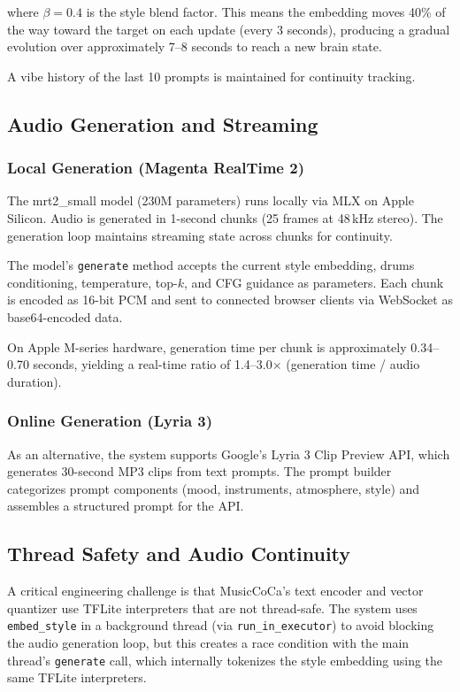 \documentclass[manuscript,review,anonymous]{acmart}
\begin{document}
where $\beta = 0.4$ is the style blend factor. This means the embedding moves 40\% of the way toward the target on each update (every 3 seconds), producing a gradual evolution over approximately 7--8 seconds to reach a new brain state.

A vibe history of the last 10 prompts is maintained for continuity tracking.

\subsection{Audio Generation and Streaming}

\subsubsection{Local Generation (Magenta RealTime 2)}

The mrt2\_small model (230M parameters) runs locally via MLX on Apple Silicon. Audio is generated in 1-second chunks (25 frames at 48\,kHz stereo). The generation loop maintains streaming state across chunks for continuity.

The model's \texttt{generate} method accepts the current style embedding, drums conditioning, temperature, top-$k$, and CFG guidance as parameters. Each chunk is encoded as 16-bit PCM and sent to connected browser clients via WebSocket as base64-encoded data.

On Apple M-series hardware, generation time per chunk is approximately 0.34--0.70 seconds, yielding a real-time ratio of 1.4--3.0$\times$ (generation time / audio duration).

\subsubsection{Online Generation (Lyria 3)}

As an alternative, the system supports Google's Lyria 3 Clip Preview API, which generates 30-second MP3 clips from text prompts. The prompt builder categorizes prompt components (mood, instruments, atmosphere, style) and assembles a structured prompt for the API.

\subsection{Thread Safety and Audio Continuity}

A critical engineering challenge is that MusicCoCa's text encoder and vector quantizer use TFLite interpreters that are not thread-safe. The system uses \texttt{embed\_style} in a background thread (via \texttt{run\_in\_executor}) to avoid blocking the audio generation loop, but this creates a race condition with the main thread's \texttt{generate} call, which internally tokenizes the style embedding using the same TFLite interpreters.
\end{document}
